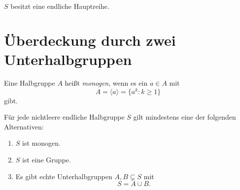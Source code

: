 \begin{theorem}
\label{b37guide:thm:principal-series}
$S$ besitzt eine endliche Hauptreihe.
\cite{howie}
\end{theorem}

\section{Überdeckung durch zwei Unterhalbgruppen}

\begin{definition}
Eine Halbgruppe $A$ heißt \emph{monogen}, wenn es ein $a\in A$ mit
\[
 A=\langle a\rangle=\{a^k:k\geq1\}
\]
gibt.
\end{definition}

\begin{theorem}
\label{thm:b37-guide-two-subsemigroup-cover}
Für jede nichtleere endliche Halbgruppe $S$ gilt mindestens eine
der folgenden Alternativen:
\begin{enumerate}
 \item $S$ ist monogen.
 \item $S$ ist eine Gruppe.
 \item Es gibt echte Unterhalbgruppen $A,B\subsetneq S$ mit
 \[
 S=A\cup B.
 \]
\end{enumerate}
\cite[Satz~1.4]{DonovenKappe2023}
\end{theorem}
